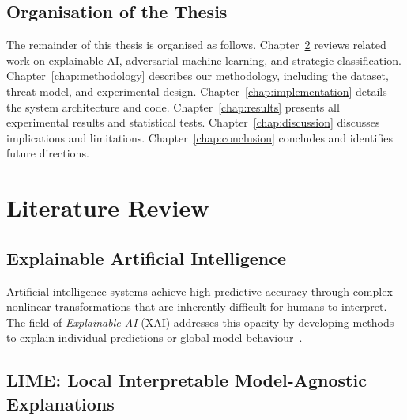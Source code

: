\documentclass[12pt, a4paper, oneside]{report}
\theoremstyle{definition}
\begin{document}
\section{Organisation of the Thesis}

The remainder of this thesis is organised as follows. Chapter~\ref{chap:litreview}
reviews related work on explainable AI, adversarial machine learning, and
strategic classification. Chapter~\ref{chap:methodology} describes our
methodology, including the dataset, threat model, and experimental design.
Chapter~\ref{chap:implementation} details the system architecture and code.
Chapter~\ref{chap:results} presents all experimental results and statistical
tests. Chapter~\ref{chap:discussion} discusses implications and limitations.
Chapter~\ref{chap:conclusion} concludes and identifies future directions.

\chapter{Literature Review}
\label{chap:litreview}


\section{Explainable Artificial Intelligence}

Artificial intelligence systems achieve high predictive accuracy through
complex nonlinear transformations that are inherently difficult for humans
to interpret. The field of \textit{Explainable AI} (XAI) addresses this
opacity by developing methods to explain individual predictions or global
model behaviour~\citep{adadi2018peeking}.


\section{LIME: Local Interpretable Model-Agnostic Explanations}
\end{document}
